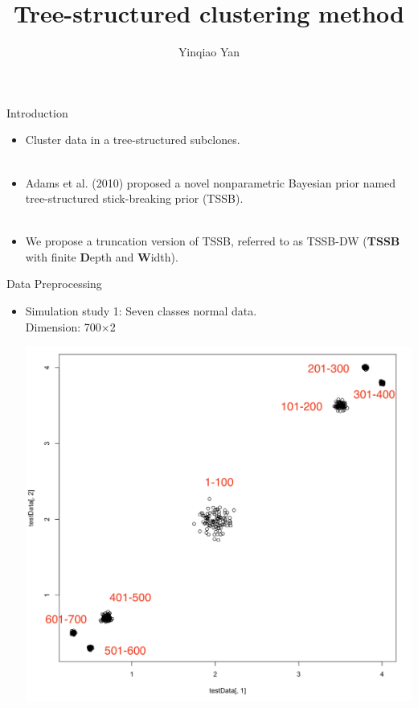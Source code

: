 \documentclass[10 pt]{beamer}
\title[]{Tree-structured clustering method}
\author[Yinqiao Yan]{Yinqiao Yan \\[2mm]}
\institute[]{Institute of Statistics and Big Data \\ Renmin University of China\\[4mm]
	
}
\date{}
\begin{document}
	
	\begin{frame}
	\titlepage
\end{frame}


\begin{frame}{Introduction}

\begin{itemize}
	\item Cluster data in a tree-structured subclones.
	~\\
	~\\
	\item Adams et al. (2010) proposed a novel nonparametric Bayesian prior named tree-structured stick-breaking prior (TSSB).
	~\\
	~\\
	\item We propose a truncation version of TSSB, referred to as TSSB-DW (\textbf{TSSB} with finite \textbf{D}epth and \textbf{W}idth).
\end{itemize}
\end{frame}

\begin{frame}{Data Preprocessing}
\begin{itemize}
	\item Simulation study 1: Seven classes normal data.
	\\
	Dimension: 700$\times$2
	\\
	\centerline{\includegraphics[scale=0.2]{figs/simulationData.png}}
	\end{itemize}
\end{frame}
\end{document}
